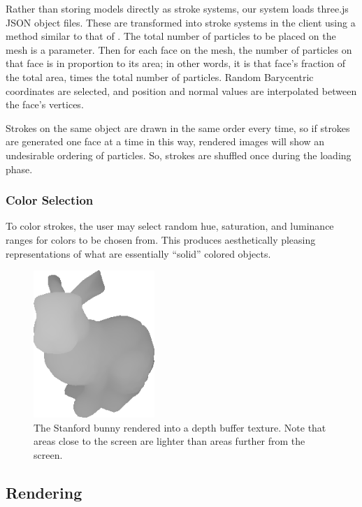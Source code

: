 \documentclass[conference]{acmsiggraph}
\begin{document}
Rather than storing models directly as stroke systems, our system loads
three.js JSON object files. These are transformed into stroke systems in the
client using a method similar to that of \cite{Meier:1996:PRA:237170.237288}.
The total number of particles to be placed on the mesh is a parameter. Then for
each face on the mesh, the number of particles on that face is in proportion to
its area; in other words, it is that face's fraction of the total area, times
the total number of particles. Random Barycentric coordinates are selected, and
position and normal values are interpolated between the face's vertices.

Strokes on the same object are drawn in the same order every time, so if
strokes are generated one face at a time in this way, rendered images will
show an undesirable ordering of particles. So, strokes are shuffled once during
the loading phase.


\subsubsection{Color Selection}

To color strokes, the user may select random hue, saturation, and luminance
ranges for colors to be chosen from. This produces aesthetically pleasing
representations of what are essentially ``solid'' colored objects.

\begin{figure}[b]
  \centering
  \includegraphics[width=1.8in]{images/better_depth_value_rendering_cropped}
  \caption{The Stanford bunny rendered into a depth buffer texture. Note that
           areas close to the screen are lighter than areas further from the
           screen.}
\end{figure}


\subsection{Rendering}
\end{document}
